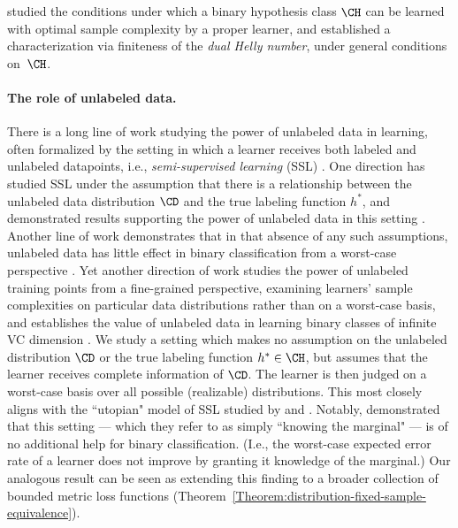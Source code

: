 \citet{bousquet2020proper} studied the conditions under which a binary hypothesis class $\CH$ can be learned with optimal sample complexity by a proper learner, and established a characterization via finiteness of the \emph{dual Helly number}, under general conditions on~$\CH$.  

\paragraph{The role of unlabeled data.} There is a long line of work studying the power of unlabeled data in learning, often formalized by the setting in which a learner receives both labeled and unlabeled datapoints, i.e., \emph{semi-supervised learning} (SSL) \citep{kaariainen2005generalization,zhu2005semi,chapelle2006semi,van2020survey}. One direction has studied SSL under the assumption that there is a relationship between the unlabeled data distribution $\CD$ and the true labeling function $h^*$, and demonstrated results supporting the power of unlabeled data in this setting \citep{castelli1995exponential,seeger2000learning,rigollet2007generalization,singh2008unlabeled,niyogi2013manifold}. Another line of work demonstrates that in that absence of any such assumptions, unlabeled data has little effect in binary classification from a worst-case perspective \citep{ben2008does,darnstadt2011smart,gopfert2019can}. Yet another direction of work studies the power of unlabeled training points from a fine-grained perspective, examining learners' sample complexities on particular data distributions rather than on a worst-case basis, and establishes the value of unlabeled data in learning binary classes of infinite VC dimension \citep{darnstadt2013unlabeled}.
We study a setting which makes no assumption on the unlabeled distribution $\CD$ or the true labeling function $h^* \in \CH$, but assumes that the learner receives complete information of $\CD$. The learner is then judged on a worst-case basis over all possible (realizable) distributions. This most closely aligns with the ``utopian" model of SSL studied by \citet{ben2008does} and \citet{lu2009fundamental}. Notably, \citet{gopfert2019can} demonstrated that this setting --- which they refer to as simply ``knowing the marginal" --- is of no additional help for binary classification. (I.e., the worst-case expected error rate of a learner does not improve by granting it knowledge of the marginal.) Our analogous result can be seen as extending this finding to a broader collection of bounded metric loss functions (Theorem~\ref{Theorem:distribution-fixed-sample-equivalence}).


